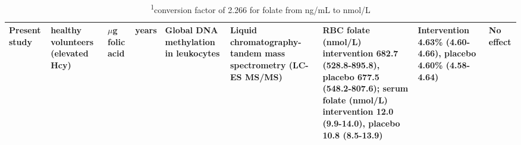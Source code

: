 \begin{sidewaystable}[hp!]
\begin{tabular}{L{1.3cm}C{1.5cm}C{1.5cm}C{1.2cm}C{1.4cm}C{1.5cm}C{2.2cm}C{2cm}C{1.8cm}}
\parbox[t][3.5cm]{1.3cm}{\raggedright Present study} &
\parbox[t][3.5cm]{1.5cm}{ healthy volunteers (elevated Hcy)} &
\parbox[t][3.5cm]{1.5cm}{$\mu$g folic acid} &
\parbox[t][3.5cm]{1.2cm}{ years} &
\parbox[t][3.5cm]{1.4cm}{\centering Global DNA methylation in leukocytes} &
\parbox[t][3.5cm]{1.5cm}{\centering Liquid chromatography-tandem mass spectrometry (LC-ES MS/MS)} &
\parbox[t][3.5cm]{2.2cm}{\centering RBC folate (nmol/L) intervention 682.7 (528.8-895.8), placebo 677.5 (548.2-807.6); serum folate (nmol/L) intervention 12.0 (9.9-14.0), placebo 10.8 (8.5-13.9)} &
\parbox[t][3.5cm]{2.0cm}{\centering Intervention 4.63\% (4.60-4.66), placebo 4.60\% (4.58-4.64)} &
\parbox[t][3.5cm]{1.8cm}{\centering No effect}\\
\hline
\end{tabular}
\caption*{\footnotesize{\textsuperscript{1}conversion factor of 2.266 for folate from ng/mL to nmol/L}}
\end{sidewaystable}
